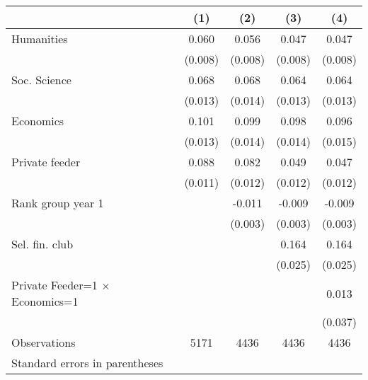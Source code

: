 \begin{tabular}{l*{4}{c}}
\toprule
                    &\multicolumn{1}{c}{(1)}&\multicolumn{1}{c}{(2)}&\multicolumn{1}{c}{(3)}&\multicolumn{1}{c}{(4)}\\
\midrule
Humanities          &       0.060&       0.056&       0.047&       0.047\\
                    &     (0.008)&     (0.008)&     (0.008)&     (0.008)\\
\addlinespace
Soc. Science        &       0.068&       0.068&       0.064&       0.064\\
                    &     (0.013)&     (0.014)&     (0.013)&     (0.013)\\
\addlinespace
Economics           &       0.101&       0.099&       0.098&       0.096\\
                    &     (0.013)&     (0.014)&     (0.014)&     (0.015)\\
\addlinespace
Private feeder      &       0.088&       0.082&       0.049&       0.047\\
                    &     (0.011)&     (0.012)&     (0.012)&     (0.012)\\
\addlinespace
Rank group year 1   &            &      -0.011&      -0.009&      -0.009\\
                    &            &     (0.003)&     (0.003)&     (0.003)\\
\addlinespace
Sel. fin. club      &            &            &       0.164&       0.164\\
                    &            &            &     (0.025)&     (0.025)\\
\addlinespace
Private Feeder=1 $\times$ Economics=1&            &            &            &       0.013\\
                    &            &            &            &     (0.037)\\
\midrule
Observations        &        5171&        4436&        4436&        4436\\
\bottomrule
\multicolumn{5}{l}{\footnotesize Standard errors in parentheses}\\
\end{tabular}
